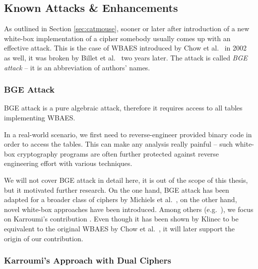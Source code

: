 \subsection{Known Attacks \& Enhancements}
\label{sec:known}

As outlined in Section \ref{sec:catmouse}, sooner or later after introduction of a new white-box implementation of a cipher somebody usually comes up with an effective attack. This is the case of WBAES introduced by Chow et al.\ \cite{chow2002aes} in 2002 as well, it was broken by Billet et al.\ \cite{billet2004cryptanalysis} two years later. The attack is called {\em BGE attack} -- it is an abbreviation of authors' names.


\subsubsection{BGE Attack}
	
	BGE attack is a pure algebraic attack, therefore it requires access to all tables implementing WBAES.
	
	\begin{note}
	\label{note:reverse}
		In a real-world scenario, we first need to reverse-engineer provided binary code in order to access the tables. This can make any analysis really painful -- such white-box cryptography programs are often further protected against reverse engineering effort with various techniques.
	\end{note}
	
	We will not cover BGE attack in detail here, it is out of the scope of this thesis, but it motivated further research. On the one hand, BGE attack has been adapted for a broader class of ciphers by Michiels et al.\ \cite{michiels2008cryptanalysis}, on the other hand, novel white-box approaches have been introduced. Among others (e.g.\ \cite{michiels2007cryptographic, xiao2009secure}), we focus on Karroumi's contribution \cite{karroumi2010protecting}. Even though it has been shown by Klinec \cite{klinec2013white} to be equivalent to the original WBAES by Chow et al.\ \cite{chow2002aes}, it will later support the origin of our contribution.   %

\subsubsection{Karroumi's Approach with Dual Ciphers}
	
